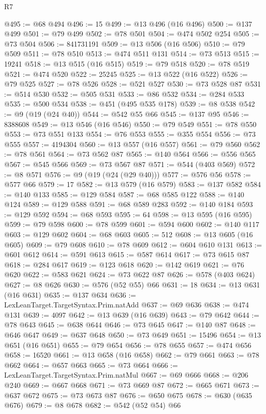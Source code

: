 \begin{lexlean}{R7}
\begin{coremodule}
@495 := @68 @494
@496 := 15
@499 := @13 @496 (@16 @496)
@500 := @137 @499
@501 := @79 @499
@502 := @78 @501
@504 := @474 @502 @254
@505 := @73 @504
@506 := 841731191
@509 := @13 @506 (@16 @506)
@510 := @79 @509
@511 := @78 @510
@513 := @474 @511 @131
@514 := @73 @513
@515 := 19241
@518 := @13 @515 (@16 @515)
@519 := @79 @518
@520 := @78 @519
@521 := @474 @520
@522 := 25245
@525 := @13 @522 (@16 @522)
@526 := @79 @525
@527 := @78 @526
@528 := @521 @527
@530 := @73 @528 @87
@531 := @514 @530
@532 := @505 @531
@533 := @86 @532
@534 := @284 @533
@535 := @500 @534
@538 := @451 (@495 @535 @178)
@539 := @8 @538
@542 := @9 (@19 (@24 @40))
@544 := @542 @55 @66
@545 := @137 @95
@546 := 8388608
@549 := @13 @546 (@16 @546)
@550 := @79 @549
@551 := @78 @550
@553 := @73 @551 @133
@554 := @76 @553
@555 := @355 @554
@556 := @73 @555
@557 := 4194304
@560 := @13 @557 (@16 @557)
@561 := @79 @560
@562 := @78 @561
@564 := @73 @562 @87
@565 := @140 @564
@566 := @556 @565
@567 := @545 @566
@569 := @73 @567 @87
@571 := @544 (@403 @569)
@572 := @8 @571
@576 := @9 (@19 (@24 (@29 @40)))
@577 := @576 @56
@578 := @577 @66
@579 := 17
@582 := @13 @579 (@16 @579)
@583 := @137 @582
@584 := @140 @133
@585 := @129 @584
@587 := @68 @585 @122
@588 := @140 @124
@589 := @129 @588
@591 := @68 @589 @283
@592 := @140 @184
@593 := @129 @592
@594 := @68 @593
@595 := 64
@598 := @13 @595 (@16 @595)
@599 := @79 @598
@600 := @78 @599
@601 := @594 @600
@602 := @140 @117
@603 := @129 @602
@604 := @68 @603
@605 := 512
@608 := @13 @605 (@16 @605)
@609 := @79 @608
@610 := @78 @609
@612 := @604 @610 @131
@613 := @601 @612
@614 := @591 @613
@615 := @587 @614
@617 := @73 @615 @87
@618 := @284 @617
@619 := @123 @618
@620 := @142 @619
@621 := @76 @620
@622 := @583 @621
@624 := @73 @622 @87
@626 := @578 (@403 @624)
@627 := @8 @626
@630 := @576 (@52 @55) @66
@631 := 18
@634 := @13 @631 (@16 @631)
@635 := @137 @634
@636 := LexLeanTarget.TargetSyntax.Prim.natAdd
@637 := @69 @636
@638 := @474 @131
@639 := 4097
@642 := @13 @639 (@16 @639)
@643 := @79 @642
@644 := @78 @643
@645 := @638 @644
@646 := @73 @645
@647 := @140 @87
@648 := @646 @647
@649 := @637 @648
@650 := @73 @649
@651 := 15496
@654 := @13 @651 (@16 @651)
@655 := @79 @654
@656 := @78 @655
@657 := @474 @656
@658 := 16520
@661 := @13 @658 (@16 @658)
@662 := @79 @661
@663 := @78 @662
@664 := @657 @663
@665 := @73 @664
@666 := LexLeanTarget.TargetSyntax.Prim.natMul
@667 := @69 @666
@668 := @206 @240
@669 := @667 @668
@671 := @73 @669 @87
@672 := @665 @671
@673 := @637 @672
@675 := @73 @673 @87
@676 := @650 @675
@678 := @630 (@635 @676)
@679 := @8 @678
@682 := @542 (@52 @54) @66

\end{coremodule}
\end{lexlean}
